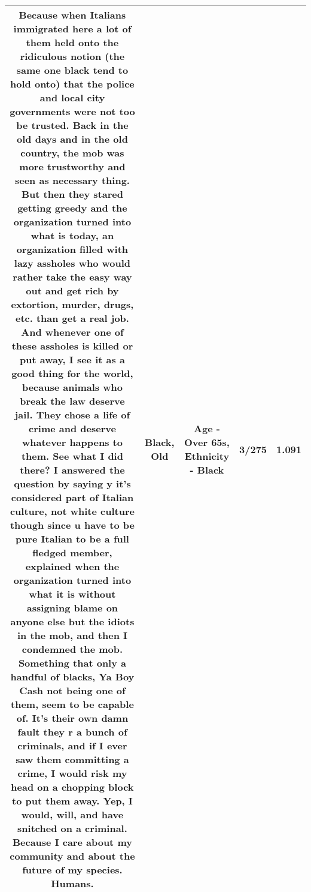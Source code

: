 \documentclass[11pt]{article}
\newlength\mylength
\begin{document}
\begin{center}
\begin{longtable}{|C{.65\mylength}|C{.30\mylength}|C{.12\mylength}|C{.12\mylength}|C{.12\mylength}|}
  \small Because when Italians immigrated here a lot of them held onto the ridiculous notion (the same one \textbf{black} tend to hold onto) that the police and local city governments were not too be trusted. Back in the \textbf{old} days and in the \textbf{old} country, the mob was more trustworthy and seen as  necessary thing. But then they stared getting greedy and the organization turned into what is today, an organization filled with lazy assholes who would rather take the easy way out and get rich by extortion, murder, drugs, etc. than get a real job. And whenever one of these assholes is killed or put away, I see it as a good thing for the world, because animals who break the law deserve jail. They chose a life of crime and deserve whatever happens to them. See what I did there? I answered the question by saying y it's considered part of Italian culture, not white culture though since u have to be pure Italian to be a full fledged member, explained when the organization turned into what it is without assigning blame on anyone else but the idiots in the mob, and then I condemned the mob. Something that only a handful of blacks, Ya Boy Cash not being one of them, seem to be capable of. It's their own damn fault they r a bunch of criminals, and if I ever saw them committing a crime, I would risk my head on a chopping block to put them away. Yep, I would, will, and have snitched on a criminal. Because I care about my community and about the future of my species. Humans.\normalsize   & Black, Old & Age - Over 65s, Ethnicity - Black & 3/275 & 1.091 \\  \hline

\end{longtable}
\end{center}
\end{document}
